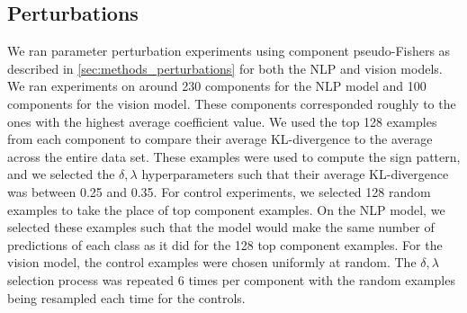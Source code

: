 \documentclass[dvipsnames]{article}
\begin{document}





\subsection{Perturbations}
We ran parameter perturbation experiments using component pseudo-Fishers as described in \cref{sec:methods_perturbations} for both the NLP and vision models.
We ran experiments on around 230 components for the NLP model and 100 components for the vision model.
These components corresponded roughly to the ones with the highest average coefficient value.
We used the top 128 examples from each component to compare their average KL-divergence to the average across the entire data set.
These examples were used to compute the sign pattern, and we selected the $\delta,\lambda$ hyperparameters such that their average KL-divergence was between 0.25 and 0.35.
% 
For control experiments, we selected 128 random examples to take the place of top component examples.
On the NLP model, we selected these examples such that the model would make the same number of predictions of each class as it did for the 128 top component examples.
For the vision model, the control examples were chosen uniformly at random.
The $\delta,\lambda$ selection process was repeated 6 times per component with the random examples being resampled each time for the controls.
\end{document}
